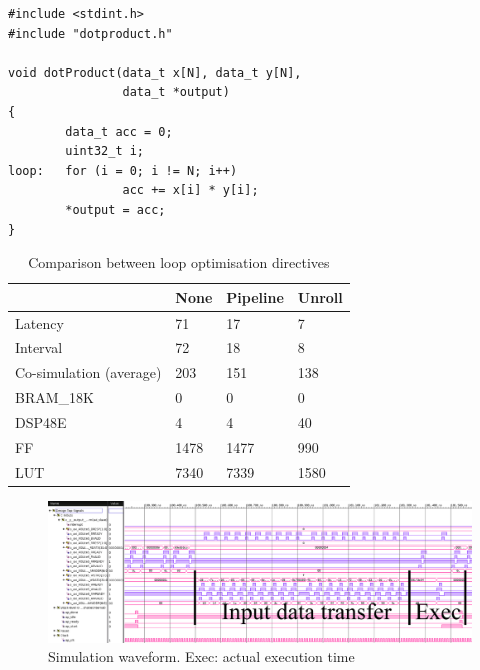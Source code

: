 \documentclass[journal]{IEEEtran}
\begin{document}
\iffalse

\begin{lstlisting}[caption={High level synthesis design for dot product},captionpos=b,label=lst:dotp]
#include <stdint.h>
#include "dotproduct.h"

void dotProduct(data_t x[N], data_t y[N],
                data_t *output)
{
        data_t acc = 0;
        uint32_t i;
loop:   for (i = 0; i != N; i++)
                acc += x[i] * y[i];
        *output = acc;
}
\end{lstlisting}



\begin{table}[!ht]
	\renewcommand{\arraystretch}{1.3}
	\caption{Comparison between loop optimisation directives}
	\label{tbl:dir}
	\centering
	\begin{tabular}{llll}
		\hline
			& None	& Pipeline	& Unroll \\
		\hline
		Latency	& 71	& 17	& 7	\\
		Interval	& 72	& 18	& 8	\\
		Co-simulation (average)	& 203	& 151	& 138	\\
		\hline
		BRAM\_18K	& 0	& 0	& 0	\\
		DSP48E	& 4	& 4	& 40	\\
		FF	& 1478	& 1477	& 990	\\
		LUT	& 7340	& 7339	& 1580	\\
		\hline
	\end{tabular}
\end{table}



\begin{figure}[!t]
	\centering
	\includegraphics[width=\textwidth]{sim}
	\caption{Simulation waveform. Exec: actual execution time}
	\label{fig:sim}
\end{figure}
\end{document}
